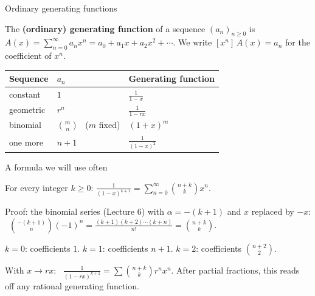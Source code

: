 \documentclass{wosm-slides}
\newcommand{\coef}[1]{[x^{#1}]\,}
\begin{document}
\begin{frame}{Ordinary generating functions}
  \begin{definition}
    The \textbf{(ordinary) generating function} of a sequence $(a_n)_{n \ge 0}$ is
    $A(x) = \sum_{n=0}^\infty a_n x^n = a_0 + a_1 x + a_2 x^2 + \cdots$.
    We write $\coef{n} A(x) = a_n$ for the coefficient of $x^n$.
  \end{definition}
  \pause
  \begin{center}
  \small\renewcommand{\arraystretch}{1.25}
  \begin{tabular}{@{}lll@{}}
    \toprule
    \textbf{Sequence} & $a_n$ & \textbf{Generating function} \\
    \midrule
    constant      & $1$              & $\frac{1}{1-x}$ \\
    geometric     & $r^n$            & $\frac{1}{1-rx}$ \\
    binomial      & $\binom{m}{n}$ \ ($m$ fixed) & $(1 + x)^m$ \\
    one more      & $n + 1$          & $\frac{1}{(1-x)^2}$ \\
    \bottomrule
  \end{tabular}
  \end{center}
\end{frame}

\begin{frame}{A formula we will use often}
  \begin{lemma}
    For every integer $k \ge 0$: \quad
    $\displaystyle \frac{1}{(1-x)^{k+1}} = \sum_{n=0}^\infty \binom{n + k}{k} x^n$.
  \end{lemma}
  {\small Proof: the binomial series (Lecture 6) with $\alpha = -(k+1)$ and $x$ replaced by
  $-x$: \ $\binom{-(k+1)}{n} (-1)^n = \frac{(k+1)(k+2)\cdots(k+n)}{n!} = \binom{n+k}{k}$.\par}
  \pause
  \begin{example}
    $k = 0$: coefficients $1$. \quad $k = 1$: coefficients $n + 1$. \quad
    $k = 2$: coefficients $\binom{n+2}{2}$.
  \end{example}
  With $x \to rx$: \ $\frac{1}{(1 - rx)^{k+1}} = \sum \binom{n+k}{k} r^n x^n$.
  After partial fractions, this reads off any rational generating function.
\end{frame}
\end{document}
